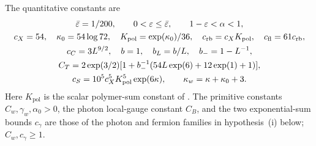 The quantitative constants are
\[
 \begin{gathered}
 \bar\varepsilon=1/200,\qquad
 0<\varepsilon\le\bar\varepsilon,\qquad 1-\varepsilon<\alpha<1,\\
 c_X=54,\quad \kappa_0=54\log72,\quad K_{\mathrm{pol}}=\exp(\kappa_0)/36,\quad
 c_{\rm rb}=c_XK_{\mathrm{pol}},\quad c_{\rm fl}=61c_{\rm rb},\\
 c_C=3L^{9/2},\quad b=1,\quad b_L=b/L,\quad b_-=1-L^{-1},\\
 C_T=2\exp(3/2)
       [1+b_-^{-1}(54L\exp(6)+12\exp(1)+1)],\\
 c_S=10^5c_X^5K_{\mathrm{pol}}^5\exp(6\kappa),\qquad
 \kappa_w=\kappa+\kappa_0+3 .
 \end{gathered}
\]
Here $K_{\mathrm{pol}}$ is the scalar polymer-sum constant of
\cite[Appendix~B, (81)]{NormalizedContraction}.
The primitive constants \(C_w,\gamma_w,\alpha_0>0\), the photon
local-gauge constant \(C_B\), and the two exponential-sum bounds
\(c_\gamma\) are those of the photon and fermion families in hypothesis~(i) below; \(C_w,c_\gamma\ge1\).


